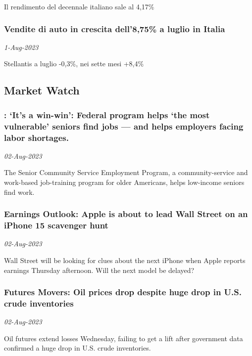 Il rendimento del decennale italiano sale al 4,17\%
\subsubsection{Vendite di auto in crescita dell'8,75\% a luglio in Italia \href{https://www.ansa.it/sito/notizie/economia/2023/08/01/vendite-di-auto-in-crescita-dell875-a-luglio-in-italia_98172ab4-f5cc-4898-9caa-886173297a66.html}{}}
\textit{1-Aug-2023}

Stellantis a luglio -0,3\%, nei sette mesi +8,4\%
\subsection{Market Watch \href{https://www.marketwatch.com/}{}}
\subsubsection{: ‘It’s a win-win’: Federal program helps ‘the most vulnerable’ seniors find jobs — and helps employers facing labor shortages. \href{http://www.marketwatch.com/news/story.asp?guid=%7B20C06575-04D4-B545-723D-D58BD57A1ECB%7D&siteid=rss&rss=1}{\ding{225}}}
\textit{02-Aug-2023}

The Senior Community Service Employment Program, a community-service and work-based job-training program for older Americans, helps low-income seniors find work.
\subsubsection{Earnings Outlook: Apple is about to lead Wall Street on an iPhone 15 scavenger hunt \href{http://www.marketwatch.com/news/story.asp?guid=%7B20C06575-04D4-B545-723C-B94F98159E42%7D&siteid=rss&rss=1}{\ding{225}}}
\textit{02-Aug-2023}

Wall Street will be looking for clues about the next iPhone when Apple reports earnings Thursday afternoon. Will the next model be delayed?
\subsubsection{Futures Movers: Oil prices drop despite huge drop in U.S. crude inventories \href{http://www.marketwatch.com/news/story.asp?guid=%7B20C06575-04D4-B545-723E-143234A906BA%7D&siteid=rss&rss=1}{\ding{225}}}
\textit{02-Aug-2023}

Oil futures extend losses Wednesday, failing to get a lift after government data confirmed a huge drop in U.S. crude inventories.
